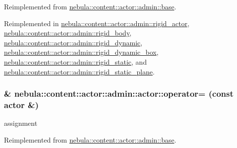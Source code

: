 Reimplemented from \hyperlink{classnebula_1_1content_1_1actor_1_1admin_1_1base_ab7aac539b0e1e06102bbb4b572d529cd}{nebula::content::actor::admin::base}.

Reimplemented in \hyperlink{classnebula_1_1content_1_1actor_1_1admin_1_1rigid__actor_a4de1558a31bb13bcf92279a4d823ddbb}{nebula::content::actor::admin::rigid\_\-actor}, \hyperlink{classnebula_1_1content_1_1actor_1_1admin_1_1rigid__body_a549b82effcb63341aa4057712446ce22}{nebula::content::actor::admin::rigid\_\-body}, \hyperlink{classnebula_1_1content_1_1actor_1_1admin_1_1rigid__dynamic_af30bd690cfa2d1a98b1458c658dc97d6}{nebula::content::actor::admin::rigid\_\-dynamic}, \hyperlink{classnebula_1_1content_1_1actor_1_1admin_1_1rigid__dynamic__box_a3d03f28e3ba455be0f39ad66e00c02c9}{nebula::content::actor::admin::rigid\_\-dynamic\_\-box}, \hyperlink{classnebula_1_1content_1_1actor_1_1admin_1_1rigid__static_a12aee11a228e35bd7a8b36ff411387a8}{nebula::content::actor::admin::rigid\_\-static}, and \hyperlink{classnebula_1_1content_1_1actor_1_1admin_1_1rigid__static__plane_a5334403f326a185523ef2c7c380ffa8f}{nebula::content::actor::admin::rigid\_\-static\_\-plane}.\hypertarget{classnebula_1_1content_1_1actor_1_1admin_1_1actor_a1fa2018d91941548c260422e1b867ba5}{
\subsubsection[{operator=}]{\& nebula::content::actor::admin::actor::operator= (const {\bf actor} \&)}}
\label{classnebula_1_1content_1_1actor_1_1admin_1_1actor_a1fa2018d91941548c260422e1b867ba5}


assignment 

Reimplemented from \hyperlink{classnebula_1_1content_1_1actor_1_1admin_1_1base_a96093c0d52eb68a36b3b80db30c2750c}{nebula::content::actor::admin::base}.

